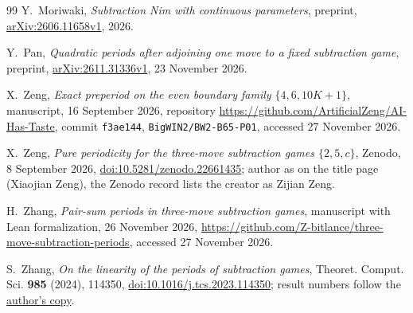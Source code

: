 \documentclass[11pt]{amsart}
\theoremstyle{definition}
\numberwithin{equation}{section}
\begin{document}
\begin{thebibliography}{99}
Y.~Moriwaki, \emph{Subtraction Nim with continuous parameters}, preprint,
\href{https://arxiv.org/abs/2606.11658v1}{arXiv:2606.11658v1}, 2026.

Y.~Pan, \emph{Quadratic periods after adjoining one move to a fixed subtraction game},
preprint, \href{https://arxiv.org/abs/2611.31336v1}{arXiv:2611.31336v1}, 23 November 2026.

X.~Zeng, \emph{Exact preperiod on the even boundary family $\{4,6,10K+1\}$}, manuscript,
16 September 2026, repository \url{https://github.com/ArtificialZeng/AI-Has-Taste}, commit
\texttt{f3ae144}, \texttt{BigWIN2/BW2-B65-P01}, accessed 27 November 2026.

X.~Zeng, \emph{Pure periodicity for the three-move subtraction games $\{2,5,c\}$}, Zenodo,
8 September 2026,
\href{https://doi.org/10.5281/zenodo.22661435}{doi:10.5281/zenodo.22661435}; author as on
the title page (Xiaojian Zeng), the Zenodo record lists the creator as Zijian Zeng.

H.~Zhang, \emph{Pair-sum periods in three-move subtraction games}, manuscript with Lean
formalization, 26 November 2026,
\url{https://github.com/Z-bitlance/three-move-subtraction-periods}, accessed 27 November 2026.

S.~Zhang, \emph{On the linearity of the periods of subtraction games}, Theoret. Comput. Sci.
\textbf{985} (2024), 114350,
\href{https://doi.org/10.1016/j.tcs.2023.114350}{doi:10.1016/j.tcs.2023.114350}; result
numbers follow the
\href{https://zhangshenxing.github.io/publications/Zhang2024tcs\%20On\%20the\%20linearity\%20of\%20the\%20periods\%20of\%20subtraction\%20games.pdf}{author's
copy}.

\end{thebibliography}
\end{document}
